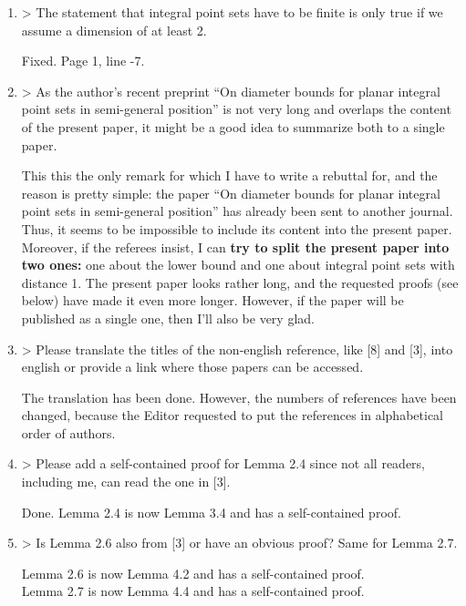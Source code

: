 \documentclass[a4paper,14pt]{article} %
\begin{document}
\begin{enumerate}
	\item
		> The statement that integral point sets have to be finite is only true if we assume a dimension of at least 2.

		Fixed. Page 1, line -7.


	\item

		> As the author’s recent preprint
		``On diameter bounds for planar integral point sets in semi-general position''
		is not very long and overlaps the content of the present paper,
		it might be a good idea to summarize both to a single paper.

		This this the only remark for which I have to write a rebuttal for,
		and the reason is pretty simple:
		the paper ``On diameter bounds for planar integral point sets in semi-general position''
		has already been sent to another journal.
		Thus, it seems to be impossible to include its content into the present paper.
		Moreover, if the referees insist, I can
		\textbf{
		try to split the present paper into two ones:
		}
		one about the lower bound and one about integral point sets with distance 1.
		The present paper looks rather long, and the requested proofs (see below)
		have made it even more longer.
		However, if the paper will be published as a single one, then I'll also be very glad.


	\item

		> Please translate the titles of the non-english reference, like [8] and [3],
		into english or provide a link where those papers can be accessed.

		The translation has been done.
		However, the numbers of references have been changed, because
		the Editor requested to put the references in alphabetical order of authors.


	\item

		> Please add a self-contained proof for Lemma 2.4 since not all readers, including me, can read the one in [3].

		Done. Lemma 2.4 is now Lemma 3.4 and has a self-contained proof.


	\item

		> Is Lemma 2.6 also from [3] or have an obvious proof? Same for Lemma 2.7.

		Lemma 2.6 is now Lemma 4.2 and has a self-contained proof.
		\\
		Lemma 2.7 is now Lemma 4.4 and has a self-contained proof.



\end{enumerate}
\end{document}
